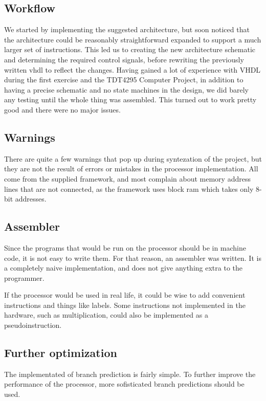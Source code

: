 \subsection{Workflow}

We started by implementing the suggested architecture, but soon noticed that the architecture could be reasonably straightforward expanded to support a much larger set of instructions.
This led us to creating the new architecture schematic and determining the required control signals, before rewriting the previously written vhdl to reflect the changes.
Having gained a lot of experience with VHDL during the first exercise and the TDT4295 Computer Project, in addition to having a precise schematic and no state machines in the design, we did barely any testing until the whole thing was assembled.
This turned out to work pretty good and there were no major issues.

\subsection{Warnings}

There are quite a few warnings that pop up during syntezation of the project, but they are not the result of errors or mistakes in the processor implementation.
All come from the supplied framework, and most complain about memory address lines that are not connected, as the framework uses block ram which takes only 8-bit addresses.

\subsection{Assembler}

Since the programs that would be run on the processor should be in machine code,
it is not easy to write them. For that reason, an assembler was written. It is a
completely naive implementation, and does not give anything extra to the
programmer. 

If the processor would be used in real life, it could be wise to add convenient
instructions and things like labels. Some instructions not implemented in the
hardware, such as multiplication, could also be implemented as a
pseudoinstruction.

\subsection{Further optimization}

The implementated of branch prediction is fairly simple. To further improve the
performance of the processor, more sofisticated branch predictions should be
used.

